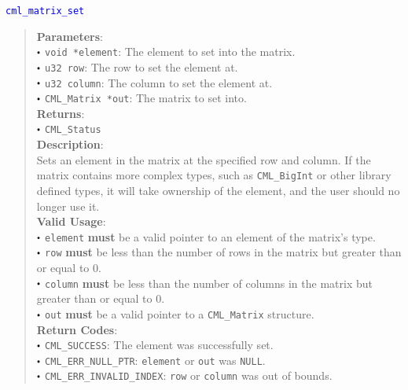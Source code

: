 \documentclass[a4paper,oneside,8pt]{extarticle}
\newcommand{\function}[1]{
  \noindent\textcolor{blue}{\texttt{#1}}
  \vspace{-0.3em}
}
\renewcommand{\dot}{\raisebox{0.3ex}{\scalebox{0.6}{$\bullet$}}}
\theoremstyle{definition}
\begin{document}
\function{cml\_matrix\_set}
\begin{quote}
  \textbf{Parameters}: \\
  $\dot$ \texttt{void *element}: The element to set into the matrix. \\
  $\dot$ \texttt{u32 row}: The row to set the element at. \\
  $\dot$ \texttt{u32 column}: The column to set the element at. \\
  $\dot$ \texttt{CML\_Matrix *out}: The matrix to set into. \\
  \textbf{Returns}: \\
  $\dot$ \texttt{CML\_Status} \\

  \vspace{-0.75em}
  \textbf{Description}: \\
  Sets an element in the matrix at the specified row and column. If the matrix contains more complex types, such as \texttt{CML\_BigInt} or other library defined types, it will take ownership of the element, and the user should no longer use it. \\

  \vspace{-0.75em}
  \textbf{Valid Usage}: \\
  $\dot$ \texttt{element} \textbf{must} be a valid pointer to an element of the matrix's type. \\
  $\dot$ \texttt{row} \textbf{must} be less than the number of rows in the matrix but greater than or equal to 0. \\
  $\dot$ \texttt{column} \textbf{must} be less than the number of columns in the matrix but greater than or equal to 0. \\
  $\dot$ \texttt{out} \textbf{must} be a valid pointer to a \texttt{CML\_Matrix} structure. \\

  \vspace{-0.75em}
  \textbf{Return Codes}: \\
  $\dot$ \texttt{CML\_SUCCESS}: The element was successfully set. \\
  $\dot$ \texttt{CML\_ERR\_NULL\_PTR}: \texttt{element} or \texttt{out} was \texttt{NULL}. \\
  $\dot$ \texttt{CML\_ERR\_INVALID\_INDEX}: \texttt{row} or \texttt{column} was out of bounds. \\
\end{quote}
\end{document}
